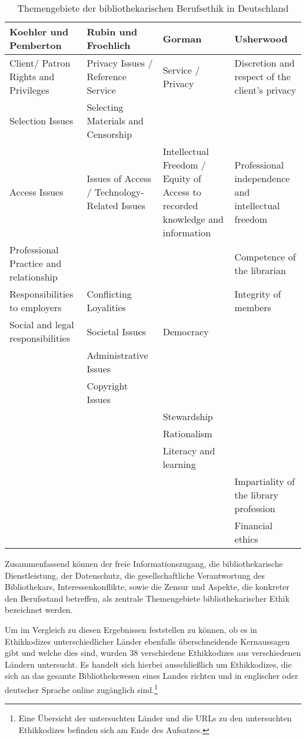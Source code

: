 \documentclass[output=paper]{langscibook}
\begin{document}
\begin{table}[htp!]
\centering
\begin{tabularx}{\textwidth}{@{} X X X X @{}}
\toprule
\textbf{Koehler und Pemberton} & \textbf{Rubin und Froehlich} & \textbf{Gorman} & \textbf{Usherwood} \\ 
\midrule
Client/ Patron Rights and Privileges & Privacy Issues / Reference Service & Service / Privacy & Discretion and respect of the client's privacy \\ 
\midrule
Selection Issues & Selecting Materials and Censorship & ~ & ~ \\ 
\midrule
Access Issues & Issues of Access / Technology-Related Issues & Intellectual Freedom / Equity of Access to recorded knowledge and information & Professional independence and intellectual freedom \\ 
\midrule
Professional Practice and relationship & ~ & ~ & Competence of the librarian \\ 
\midrule
Responsibilities to employers & Conflicting Loyalities & ~ & Integrity of members \\ 
\midrule
Social and legal responsibilities & Societal Issues & Democracy & ~ \\ 
\midrule
~ & Administrative Issues & ~ & ~ \\ 
\midrule
~ & Copyright Issues & ~ & ~ \\ 
\midrule
~ & ~ & Stewardship & ~ \\ 
\midrule
~ & ~ & Rationalism & ~ \\ 
\midrule
~ & ~ & Literacy and learning & ~ \\ 
\midrule
~ & ~ & ~ & Impartiality of the library profession \\ 
\midrule
~ & ~ & ~ & Financial ethics \\
\bottomrule
\end{tabularx}
\caption{Themengebiete der bibliothekarischen Berufsethik in Deutschland}
\end{table}

Zusammenfassend können der freie Informationszugang, die
bibliothekarische Dienstleistung, der Datenschutz, die gesellschaftliche
Verantwortung des Bibliothekars, Interessenkonflikte, sowie die Zensur
und Aspekte, die konkreter den Berufsstand betreffen, als zentrale
Themengebiete bibliothekarischer Ethik bezeichnet werden.

Um im Vergleich zu diesen Ergebnissen feststellen zu können, ob es in
Ethikkodizes unterschiedlicher Länder ebenfalls überschneidende
Kernaussagen gibt und welche dies sind, wurden 38 verschiedene
Ethikkodizes aus verschiedenen Ländern untersucht. Es handelt sich
hierbei ausschließlich um Ethikkodizes, die sich an das gesamte
Bibliothekswesen eines Landes richten und in englischer oder deutscher
Sprache online zugänglich sind.\footnote{Eine Übersicht der untersuchten
  Länder und die URLs zu den untersuchten Ethikkodizes befinden sich am
  Ende des Aufsatzes.}
\end{document}
